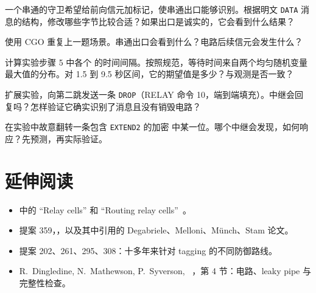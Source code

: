\begin{esercizio}[2]\label{es:10-tag}
一个串通的守卫希望给前向信元加标记，使串通出口能够识别。根据明文 \texttt{DATA} 消息的结构，修改哪些字节比较合适？如果出口是诚实的，它会看到什么结果？
\end{esercizio}

\begin{esercizio}[2]\label{es:10-cgo-tag}
使用 CGO 重复上一题场景。串通出口会看到什么？电路后续信元会发生什么？
\end{esercizio}

\begin{esercizio}[2]\label{es:10-padding}
计算实验步骤 5 中各个  的时间间隔。按照规范，等待时间来自两个均匀随机变量最大值的分布。对 1.5 到 9.5 秒区间，它的期望值是多少？与观测是否一致？
\end{esercizio}

\begin{esercizio}[3]\label{es:10-drop}
扩展实验，向第二跳发送一条 \texttt{DROP}（RELAY 命令 10，端到端填充）。中继会回复吗？怎样验证它确实识别了消息且没有销毁电路？
\end{esercizio}

\begin{esercizio}[3]\label{es:10-alterazione}
在实验中故意翻转一条包含 \texttt{EXTEND2} 的加密  中某一位。哪个中继会发现，如何响应？先预测，再实际验证。
\end{esercizio}

\section*{延伸阅读}
\begin{itemize}
  \item {} 中的 \enquote{Relay cells} 和 \enquote{Routing relay cells}~\cite{torspec}。
  \item 提案 359，，以及其中引用的 Degabriele、Melloni、Münch、Stam 论文。
  \item 提案 202、261、295、308：十多年来针对 tagging 的不同防御路线。
  \item R.~Dingledine, N.~Mathewson, P.~Syverson, ~\cite{dingledine2004tor}，第 4 节：电路、leaky pipe 与完整性检查。
\end{itemize}
